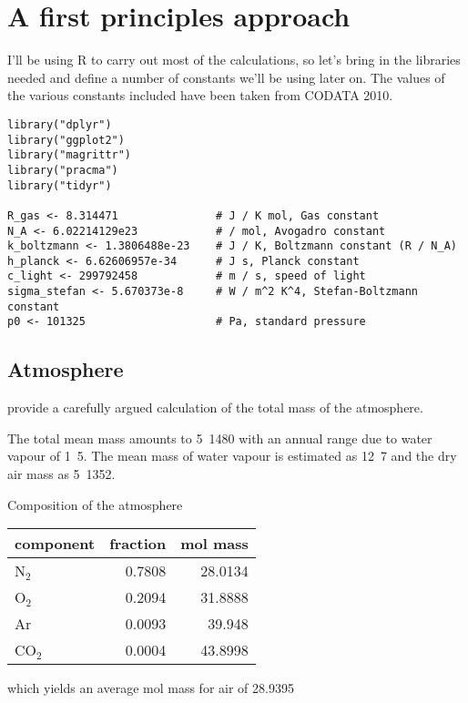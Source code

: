 \documentclass[10pt,a4paper,titlepage]{article}
\begin{document}
\section{A first principles approach}
\label{sec-3}
I'll be using R to carry out most of the calculations, so let's bring
in the libraries needed and define a number of constants we'll be
using later on. The values of the various constants included have been
taken from CODATA 2010.

\begin{lstlisting}
library("dplyr")
library("ggplot2")
library("magrittr")
library("pracma")
library("tidyr")

R_gas <- 8.314471               # J / K mol, Gas constant
N_A <- 6.02214129e23            # / mol, Avogadro constant
k_boltzmann <- 1.3806488e-23    # J / K, Boltzmann constant (R / N_A)
h_planck <- 6.62606957e-34      # J s, Planck constant
c_light <- 299792458            # m / s, speed of light
sigma_stefan <- 5.670373e-8     # W / m^2 K^4, Stefan-Boltzmann constant
p0 <- 101325                    # Pa, standard pressure
\end{lstlisting}

\subsection{Atmosphere}
\label{sec-3-1}
\citet{trenberth-smith05:atmosphere} provide a carefully argued
calculation of the total mass of the atmosphere.

The total mean mass amounts to \unit{5.1480}{\exad\kilogram} with an
annual range due to water vapour of \unit{1.5}{\petad\kilogram}. The
mean mass of water vapour is estimated as \unit{12.7}{\petad\kilogram}
and the dry air mass as \unit{5.1352}{\exad\kilogram}.

Composition of the atmosphere
\begin{center}
\begin{tabular}{lrr}
\toprule
component & fraction & mol mass\\
\midrule
N$_{\text{2}}$ & 0.7808 & 28.0134\\
O$_{\text{2}}$ & 0.2094 & 31.8888\\
Ar & 0.0093 & 39.948\\
CO$_{\text{2}}$ & 0.0004 & 43.8998\\
\bottomrule
\end{tabular}
\end{center}
which yields an average mol mass for air of 28.9395
\end{document}
